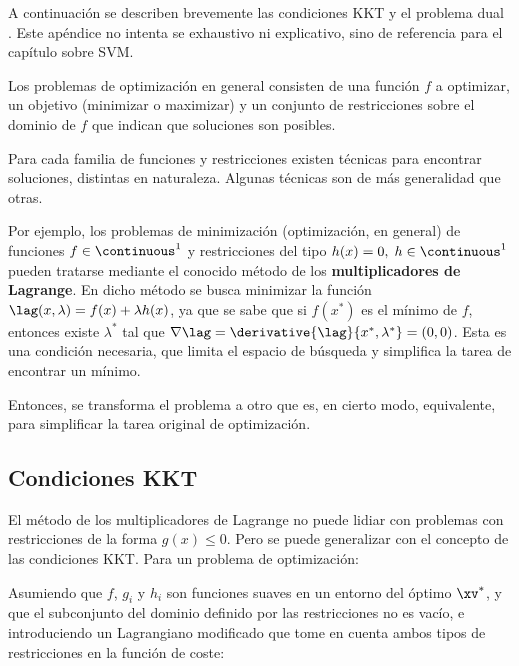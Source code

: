 
A continuación se describen brevemente las condiciones KKT y el problema dual \cite{boyd2004}. Este apéndice no intenta se exhaustivo ni explicativo, sino de referencia para el capítulo sobre SVM.

Los problemas de optimización en general consisten de una función $f$ a optimizar, un objetivo (minimizar o maximizar) y un conjunto de restricciones sobre el dominio de $f$ que indican que soluciones son posibles.


Para cada familia de funciones y restricciones existen técnicas para encontrar soluciones, distintas en naturaleza. Algunas técnicas son de más generalidad que otras.

Por ejemplo, los problemas de minimización (optimización, en general) de funciones $f \in \continuous^1$ y restricciones del tipo  $h(x)=0, \; h \in \continuous^1$ pueden tratarse mediante el conocido método de los \textbf{multiplicadores de Lagrange}. En dicho método se busca minimizar la función $\lag(x,\lambda) = f(x) + \lambda h(x)$, ya que se sabe que si  $f(x^*)$ es el mínimo de $f$, entonces existe $\lambda^*$ tal que $\nabla \lag = \derivative{\lag}{x^*,\lambda^*} = (0,0)$. Esta es una condición necesaria, que limita el espacio de búsqueda y simplifica la tarea de encontrar un mínimo.

Entonces, se transforma el problema a otro que es, en cierto modo, equivalente, para simplificar la tarea original de optimización.


\subsection{Condiciones KKT}

El método de los multiplicadores de Lagrange no puede lidiar con problemas con restricciones de la forma $g(x) \leq 0$. Pero se puede generalizar con el concepto de  las condiciones KKT. Para un problema de optimización:


Asumiendo que $f$, $g_i$ y $h_i$ son funciones suaves en un entorno del óptimo $\xv^*$, y que el subconjunto del dominio definido por las restricciones no es vacío, e introduciendo un Lagrangiano modificado que tome en cuenta ambos tipos de restricciones en la función de coste:

